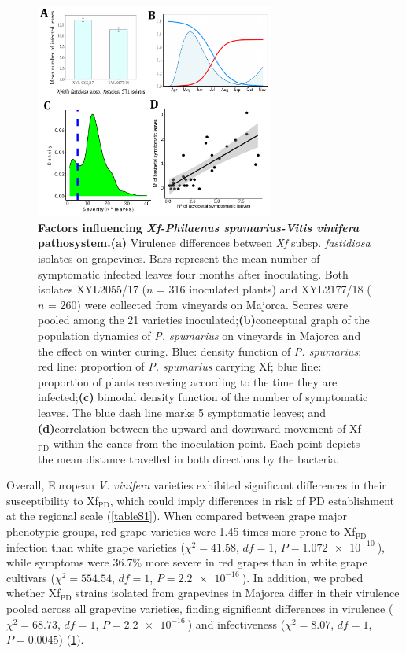 \begin{figure}[H]
    \centering
    \includegraphics[width=0.7\textwidth]{Figures/Fig S1.pdf}
    \caption{\textbf{Factors influencing \textit {Xf-Philaenus
                spumarius-Vitis vinifera} pathosystem.}\textbf{(a)} Virulence
        differences
        between \textit{Xf} subsp. \textit{fastidiosa} isolates on grapevines.
        Bars
        represent the mean number of symptomatic infected leaves four months
        after
        inoculating. Both isolates XYL2055/17 ($n$ = 316 inoculated plants) and
        XYL2177/18 ($n$ = 260) were collected from vineyards on Majorca. Scores
        were
        pooled among the 21 varieties inoculated;\textbf{(b)}conceptual graph
        of the
        population dynamics of \textit{P. spumarius} on vineyards in Majorca
        and the
        effect on winter curing. Blue: density function of \textit{P.
            spumarius}; red
        line: proportion of \textit{P. spumarius} carrying Xf; blue line:
        proportion of
        plants recovering according to the time they are infected;\textbf{(c)}
        bimodal
        density function of the number of symptomatic leaves. The blue dash
        line marks
        5 symptomatic leaves; and \textbf{(d)}correlation between the upward
        and
        downward movement of Xf$_{\textrm{PD}}$ within the canes from the
        inoculation
        point. Each point depicts the mean distance travelled in both
        directions by the
        bacteria.
        \label{figS1}} %
\end{figure}

Overall, European \textit{V. vinifera} varieties exhibited significant
differences in their susceptibility to Xf$_{\textrm{PD}}$, which could imply
differences in risk of PD establishment at the regional scale (\cref{tableS1}).
When compared between grape major phenotypic groups, red grape varieties were
1.45 times more prone to Xf$_{\textrm{PD}}$ infection than white grape
varieties ($\chi^2= 41.58$, $df=1$, $P=\SI{1.072e-10}{}$), while symptoms were
36.7\% more severe in red grapes than in white grape cultivars
($\chi^2=554.54$, $df=1$, $P=\SI{2.2e-16}{}$).	In addition, we probed whether
Xf$_{\textrm{PD}}$ strains isolated from grapevines in Majorca differ in their
virulence pooled across all grapevine varieties, finding significant
differences in virulence ($\chi^2 = 68.73$, $df = 1$, $P = \SI{2.2e-16}{}$) and
infectiveness ($\chi^2 = 8.07$, $df = 1$, $P =0.0045$) (\cref{figS1}).

